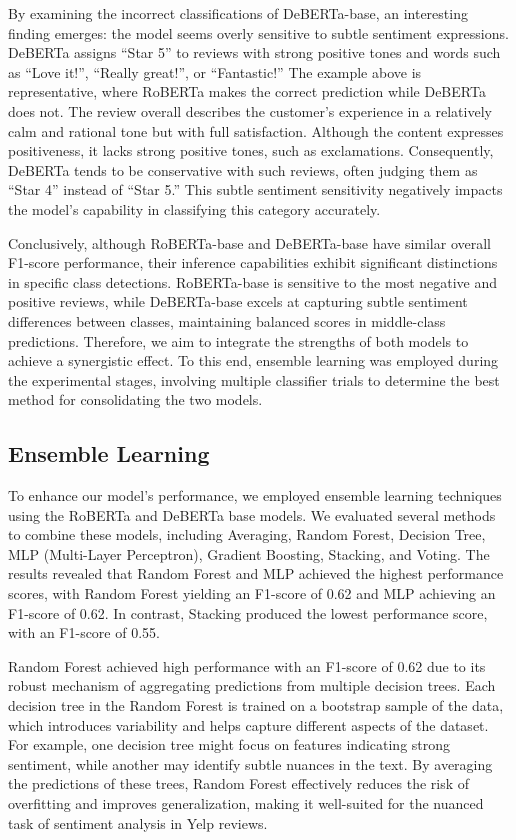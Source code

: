 \documentclass[11pt]{article}
\begin{document}
By examining the incorrect classifications of DeBERTa-base, an interesting finding emerges: the model seems overly sensitive to subtle sentiment expressions. DeBERTa assigns “Star 5” to reviews with strong positive tones and words such as “Love it!”, “Really great!”, or “Fantastic!” The example above is representative, where RoBERTa makes the correct prediction while DeBERTa does not. The review overall describes the customer’s experience in a relatively calm and rational tone but with full satisfaction. Although the content expresses positiveness, it lacks strong positive tones, such as exclamations. Consequently, DeBERTa tends to be conservative with such reviews, often judging them as “Star 4” instead of “Star 5.” This subtle sentiment sensitivity negatively impacts the model’s capability in classifying this category accurately.

Conclusively, although RoBERTa-base and DeBERTa-base have similar overall F1-score performance, their inference capabilities exhibit significant distinctions in specific class detections. RoBERTa-base is sensitive to the most negative and positive reviews, while DeBERTa-base excels at capturing subtle sentiment differences between classes, maintaining balanced scores in middle-class predictions. Therefore, we aim to integrate the strengths of both models to achieve a synergistic effect. To this end, ensemble learning was employed during the experimental stages, involving multiple classifier trials to determine the best method for consolidating the two models.

\subsection{Ensemble Learning}
To enhance our model's performance, we employed ensemble learning techniques using the RoBERTa and DeBERTa base models. We evaluated several methods to combine these models, including Averaging, Random Forest, Decision Tree, MLP (Multi-Layer Perceptron), Gradient Boosting, Stacking, and Voting. The results revealed that Random Forest and MLP achieved the highest performance scores, with Random Forest yielding an F1-score of 0.62 and MLP achieving an F1-score of 0.62. In contrast, Stacking produced the lowest performance score, with an F1-score of 0.55.

Random Forest achieved high performance with an F1-score of 0.62 due to its robust mechanism of aggregating predictions from multiple decision trees. Each decision tree in the Random Forest is trained on a bootstrap sample of the data, which introduces variability and helps capture different aspects of the dataset. For example, one decision tree might focus on features indicating strong sentiment, while another may identify subtle nuances in the text. By averaging the predictions of these trees, Random Forest effectively reduces the risk of overfitting and improves generalization, making it well-suited for the nuanced task of sentiment analysis in Yelp reviews.
\end{document}
